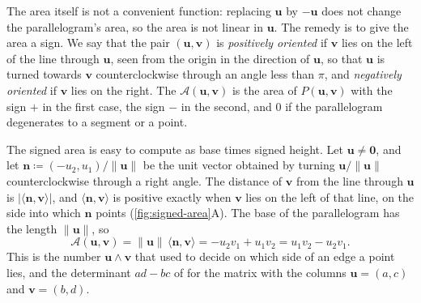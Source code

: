 The area itself is not a convenient function: replacing $\mathbf u$ by $-\mathbf u$ does not change the parallelogram's area, so the area is not linear in $\mathbf u$. The remedy is to give the area a sign. We say that the pair $(\mathbf u,\mathbf v)$ is \emph{positively oriented} if $\mathbf v$ lies on the left of the line through $\mathbf u$, seen from the origin in the direction of $\mathbf u$, so that $\mathbf u$ is turned towards $\mathbf v$ counterclockwise through an angle less than $\pi$, and \emph{negatively oriented} if $\mathbf v$ lies on the right. The  $\mathcal A(\mathbf u,\mathbf v)$ is the area of $P(\mathbf u,\mathbf v)$ with the sign $+$ in the first case, the sign $-$ in the second, and $0$ if the parallelogram degenerates to a segment or a point.

The signed area is easy to compute as base times signed height. Let $\mathbf u\ne\mathbf 0$, and let $\mathbf n\coloneqq(-u_2,u_1)/\|\mathbf u\|$ be the unit vector obtained by turning $\mathbf u/\|\mathbf u\|$ counterclockwise through a right angle. The distance of $\mathbf v$ from the line through $\mathbf u$ is $|\langle\mathbf n,\mathbf v\rangle|$, and $\langle\mathbf n,\mathbf v\rangle$ is positive exactly when $\mathbf v$ lies on the left of that line, on the side into which $\mathbf n$ points (\cref{fig:signed-area}A). The base of the parallelogram has the length $\|\mathbf u\|$, so
\begin{equation}
\mathcal A(\mathbf u,\mathbf v)=\|\mathbf u\|\,\langle\mathbf n,\mathbf v\rangle=-u_2v_1+u_1v_2=u_1v_2-u_2v_1 .
\label{eq:signed-area}
\end{equation}
This is the number $\mathbf u\wedge\mathbf v$ that  used to decide on which side of an edge a point lies, and the determinant $ad-bc$ of  for the matrix with the columns $\mathbf u=(a,c)$ and $\mathbf v=(b,d)$.

